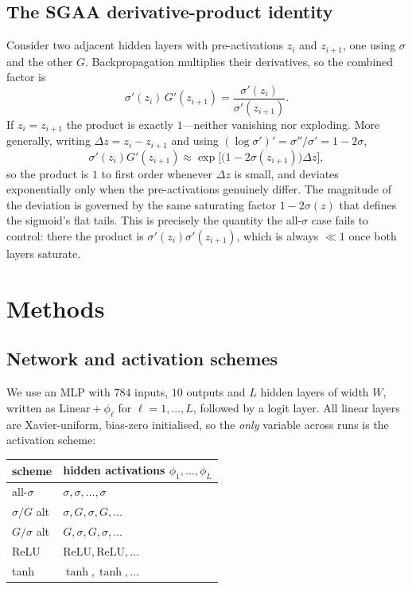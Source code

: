 \documentclass[11pt]{article}
\begin{document}
\subsection{The SGAA derivative-product identity}
\label{sec:identity}
Consider two adjacent hidden layers with pre-activations $z_i$ and $z_{i+1}$,
one using $\sigma$ and the other $G$. Backpropagation multiplies their
derivatives, so the combined factor is
\begin{equation}
  \boxed{\;\sigma'(z_i)\,G'(z_{i+1})=\frac{\sigma'(z_i)}{\sigma'(z_{i+1})}.\;}
\end{equation}
If $z_i=z_{i+1}$ the product is exactly $1$---neither vanishing nor
exploding. More generally, writing $\Delta z=z_i-z_{i+1}$ and using
$(\log\sigma')'=\sigma''/\sigma'=1-2\sigma$,
\begin{equation}
  \sigma'(z_i)G'(z_{i+1})\approx
  \exp\!\bigl[\bigl(1-2\sigma(z_{i+1})\bigr)\Delta z\bigr],
\end{equation}
so the product is $1$ to first order whenever $\Delta z$ is small, and deviates
exponentially only when the pre-activations genuinely differ. The magnitude of
the deviation is governed by the same saturating factor $1-2\sigma(z)$ that
defines the sigmoid's flat tails. This is precisely the quantity the all-$\sigma$
case fails to control: there the product is $\sigma'(z_i)\sigma'(z_{i+1})$, which is
always $\ll1$ once both layers saturate.

\section{Methods}
\label{sec:methods}

\subsection{Network and activation schemes}
We use an MLP with $784$ inputs, $10$ outputs and $L$ hidden layers of width
$W$, written as $\mathrm{Linear}+\phi_\ell$ for $\ell=1,\dots,L$, followed by a
logit layer. All linear layers are Xavier-uniform, bias-zero initialised, so the
\emph{only} variable across runs is the activation scheme:
\begin{center}
\begin{tabular}{ll}
\toprule
scheme & hidden activations $\phi_1,\dots,\phi_L$\\
\midrule
all-$\sigma$        & $\sigma,\sigma,\dots,\sigma$\\
$\sigma/G$ alt      & $\sigma,G,\sigma,G,\dots$\\
$G/\sigma$ alt      & $G,\sigma,G,\sigma,\dots$\\
ReLU                & $\mathrm{ReLU},\mathrm{ReLU},\dots$\\
tanh                & $\tanh,\tanh,\dots$\\
\bottomrule
\end{tabular}
\end{center}
\end{document}
